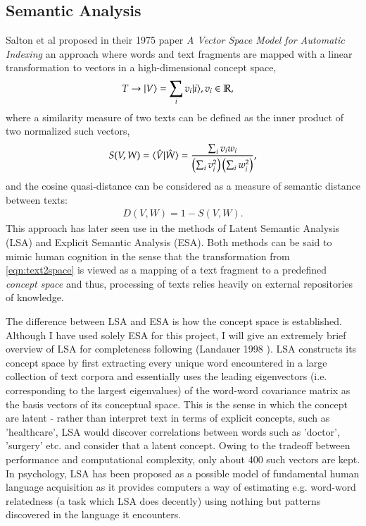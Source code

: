 \subsection{Semantic Analysis}
\label{sec:semantic_analysis}
Salton et al proposed in their 1975 paper \textit{A Vector Space Model for Automatic Indexing}\cite{Salton1975} an approach where words and text fragments are mapped with a linear transformation to vectors in a high-dimensional concept space,
\begin{align}
	T \rightarrow | V \rangle &= \sum_i v_i | i \rangle, v_i\in\mathbb{R}, \label{eqn:text2space}
\end{align}
where a similarity measure of two texts can be defined as the inner product of two normalized such vectors,
\begin{align}
	S(V,W) = \langle \hat{V} | \hat{W} \rangle = \frac{\sum_i v_i w_i}{\left( \sum_i v_i^2 \right)\left( \sum_iw_i^2 \right)},
\end{align}
and the cosine quasi-distance can be considered as a measure of semantic distance between texts:
\begin{align}
	D(V,W) = 1-S(V,W).
\end{align}
This approach has later seen use in the methods of Latent Semantic Analysis (LSA) and Explicit Semantic Analysis (ESA). Both methods can be said to mimic human cognition in the sense that the transformation from \eqref{eqn:text2space} is viewed as a mapping of a text fragment to a predefined \textit{concept space} and thus, processing of texts relies heavily on external repositories of knowledge.

The difference between LSA and ESA is how the concept space is established. Although I have used solely ESA for this project, I will give an extremely brief overview of LSA for completeness following (Landauer 1998 \cite{Landauer1998}). LSA constructs its concept space by first extracting every unique word encountered in a large collection of text corpora and essentially uses the leading eigenvectors (i.e. corresponding to the largest eigenvalues) of the word-word covariance matrix as the basis vectors of its conceptual space. This is the sense in which the concept are latent - rather than interpret text in terms of explicit concepts, such as 'healthcare', LSA would discover correlations between words such as 'doctor', 'surgery' etc. and consider that a latent concept. Owing to the tradeoff between performance and computational complexity, only about 400 such vectors are kept\cite{Nakov2000}. In psychology, LSA has been proposed as a possible model of fundamental human language acquisition as it provides computers a way of estimating e.g. word-word relatedness (a task which LSA does decently) using nothing but patterns discovered in the language it encounters\cite{Landauer1998}.

